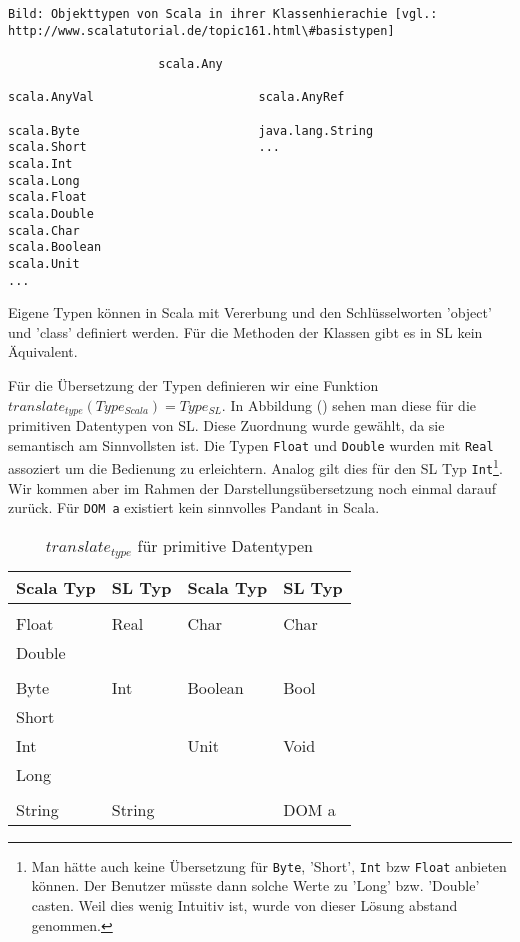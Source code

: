 \documentclass[12pt,a4paper]{report}
\begin{document}
\begin{lstlisting}
Bild: Objekttypen von Scala in ihrer Klassenhierachie [vgl.: http://www.scalatutorial.de/topic161.html\#basistypen]

                     scala.Any

scala.AnyVal                       scala.AnyRef

scala.Byte                         java.lang.String
scala.Short                        ...
scala.Int
scala.Long
scala.Float
scala.Double
scala.Char
scala.Boolean
scala.Unit
...
\end{lstlisting}

Eigene Typen können in Scala mit Vererbung und den Schlüsselworten 'object' und 'class' definiert werden. Für die Methoden der Klassen gibt es in \ac{SL} kein Äquivalent.

Für die Übersetzung der Typen definieren wir eine Funktion $translate_{type}(Type_{Scala}) = Type_{SL}$. In Abbildung () sehen man diese für die primitiven Datentypen von \ac{SL}. Diese Zuordnung wurde gewählt, da sie semantisch am Sinnvollsten ist. Die Typen \lstinline!Float! und \lstinline!Double! wurden mit \lstinline!Real! assoziert um die Bedienung zu erleichtern. Analog gilt dies für den \ac{SL} Typ \lstinline!Int!\footnote{Man hätte auch keine Übersetzung für \lstinline!Byte!, 'Short', \lstinline!Int! bzw \lstinline!Float! anbieten können. Der Benutzer müsste dann solche Werte zu 'Long' bzw. 'Double' casten. Weil dies wenig Intuitiv ist, wurde von dieser Lösung abstand genommen.}. Wir kommen aber im Rahmen der Darstellungsübersetzung noch einmal darauf zurück. Für \lstinline!DOM a! existiert kein sinnvolles Pandant in Scala.

\begin{table}
\caption{$translate_{type}$ für primitive Datentypen}
\centering
\begin{tabular}{ll|ll}
Scala Typ & \ac{SL} Typ & Scala Typ & \ac{SL} Typ \\
\hline
\\
 Float & Real & Char & Char\\
   Double   &  \\
      &&&\\
Byte  &   Int & Boolean & Bool \\
 Short     &  \\
 Int    &  & Unit &  Void\\
  Long   &  \\
     &&&\\
 String & String &  & DOM a \\

\end{tabular}
\end{table}
\end{document}

